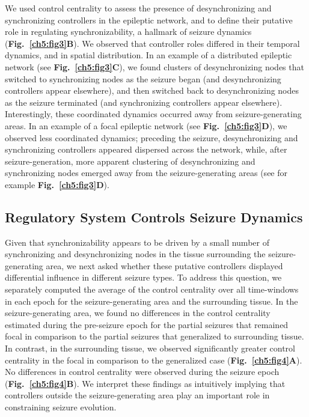We used control centrality to assess the presence of desynchronizing and synchronizing controllers in the epileptic network, and to define their putative role in regulating synchronizability, a hallmark of seizure dynamics (\textbf{Fig.~\ref{ch5:fig3}B}). We observed that controller roles differed in their temporal dynamics, and in spatial distribution. In an example of a distributed epileptic network (see \textbf{Fig.~\ref{ch5:fig3}C}), we found clusters of desynchronizing nodes that switched to synchronizing nodes as the seizure began (and desynchronizing controllers appear elsewhere), and then switched back to desynchronizing nodes as the seizure terminated (and synchronizing controllers appear elsewhere). Interestingly, these coordinated dynamics occurred away from seizure-generating areas. In an example of a focal epileptic network (see \textbf{Fig.~\ref{ch5:fig3}D}), we observed less coordinated dynamics; preceding the seizure, desynchronizing and synchronizing controllers appeared dispersed across the network, while, after seizure-generation, more apparent clustering of desynchronizing and synchronizing nodes emerged away from the seizure-generating areas (see for example \textbf{Fig.~\ref{ch5:fig3}D}).

\subsection{Regulatory System Controls Seizure Dynamics}
Given that synchronizability appears to be driven by a small number of synchronizing and desynchronizing nodes in the tissue surrounding the seizure-generating area, we next asked whether these putative controllers displayed differential influence in different seizure types. To address this question, we separately computed the average of the control centrality over all time-windows in each epoch for the seizure-generating area and the surrounding tissue. In the seizure-generating area, we found no differences in the control centrality estimated during the pre-seizure epoch for the partial seizures that remained focal in comparison to the partial seizures that generalized to surrounding tissue. In contrast, in the surrounding tissue, we observed significantly greater control centrality in the focal in comparison to the generalized case (\textbf{Fig.~\ref{ch5:fig4}A}). No differences in control centrality were observed during the seizure epoch (\textbf{Fig.~\ref{ch5:fig4}B}). We interpret these findings as intuitively implying that controllers outside the seizure-generating area play an important role in constraining seizure evolution.

